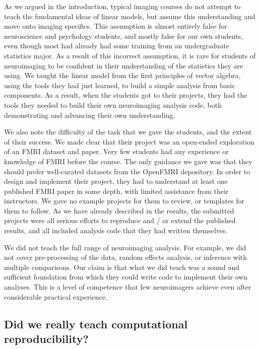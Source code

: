 As we argued in the introduction, typical imaging courses do not attempt to
teach the fundamental ideas of linear models, but assume this understanding
and move onto imaging specifics.  This assumption is almost entirely false for
neuroscience and psychology students, and mostly false for our own
students, even though most had already had some training from an undergraduate
statistics major. As a result of this incorrect assumption, it is rare for
students of neuroimaging to be confident in their understanding of the
statistics they are using.  We taught the linear model from the first
principles of vector algebra, using the tools they had just learned, to build
a simple analysis from basic components.  As a result, when the students got
to their projects, they had the tools they needed to build their own
neuroimaging analysis code, both demonstrating and advancing their own
understanding.

We also note the difficulty of the task that we gave the students, and the
extent of their success.  We made clear that their project was an open-ended
exploration of an FMRI dataset and paper.  Very few students had any
experience or knowledge of FMRI before the course. The only guidance we gave
was that they should prefer well-curated datasets from the OpenFMRI
depository.  In order to design and implement their project, they had to
understand at least one published FMRI paper in some depth, with limited
assistance from their instructors.  We gave no example projects for them to
review, or templates for them to follow.  As we have already described in the
results, the submitted projects were all serious efforts to reproduce and
/ or extend the published results, and all included analysis code that they
had written themselves.

We did not teach the full range of neuroimaging analysis.  For example, we did
not cover pre-processing of the data, random effects analysis, or inference
with multiple comparisons.   Our claim is that what we did teach was a sound
and sufficient foundation from which they could write code to implement their
own analyses.  This is a level of competence that few neuroimagers achieve
even after considerable practical experience.

\subsection{Did we really teach computational reproducibility?}

